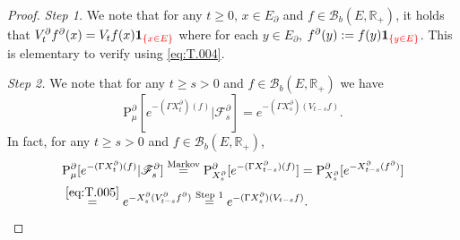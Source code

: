 \documentclass[12pt,a4paper]{amsart}
\numberwithin{equation}{section}
\theoremstyle{plain}
\theoremstyle{definition}
\theoremstyle{remark}
\begin{document}
\begin{proof}
\emph{Step 1.}
	We note that for any $t\geq 0$, $x\in E_\partial$ and $f\in \mathcal B_b(E,\mathbb R_+)$, it holds that $V_t^\partial f^\partial (x) = V_tf(x) \mathbf 1_{{\color{red}\{x\in E\}}}$ where for each $y\in E_\partial$, $f^\partial(y) := f(y) \mathbf 1_{{\color{red}\{y\in E\}}}$.
	This is elementary to verify using \eqref{eq:T.004}.

\emph{Step 2.}
	We note that for any $t\geq s>0$ and $f\in \mathcal B_b(E,\mathbb R_+)$ we have
\[
	\mathrm P_\mu^\partial [e^{- (\Gamma X_t^\partial)(f)} | \mathscr F_s^\partial]
	= e^{- (\Gamma X_s^\partial)(V_{t-s}f)}.
\]
	In fact, for any $t\geq s>0$ and $f\in \mathcal B_b(E,\mathbb R_+)$,
\begin{align}
	&\mathrm P_\mu^\partial [e^{- (\Gamma X_t^\partial)(f)} | \mathscr F_s^\partial]
	\overset{\text{Markov}}= \mathrm P_{X_s^\partial}^\partial [e^{- (\Gamma X_{t-s}^\partial)(f)} ]
	= \mathrm P_{X_s^\partial}^\partial [e^{- X_{t-s}^\partial(f^\partial)} ]
	\\ &\overset{\eqref{eq:T.005}}= e^{- X_s^\partial(V_{t-s}^\partial f^\partial)}
	\overset{\text{Step 1}} = e^{- (\Gamma X_s^\partial)(V_{t-s}f)}.
\end{align}
	

\end{proof}
\end{document}

